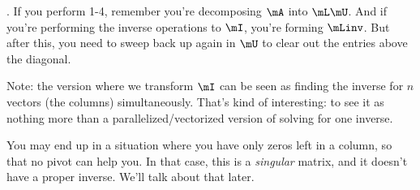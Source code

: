 . If you perform 1-4, remember you're
decomposing $\mA$ into $\mL\mU$. And if you're performing the inverse
operations to $\mI$, you're forming $\mLinv$. But after this, you need
to sweep back up again in $\mU$ to clear out the entries above the
diagonal.

Note: the version where we transform $\mI$ can be seen as finding the
inverse for $n$ vectors (the columns) simultaneously. That's kind of
interesting: to see it as nothing more than a parallelized/vectorized
version of solving for one inverse.

You may end up in a situation where you have only zeros left in a
column, so that no pivot can help you. In that case, this is a
\emph{singular} matrix, and it doesn't have a proper inverse. We'll talk
about that later.
